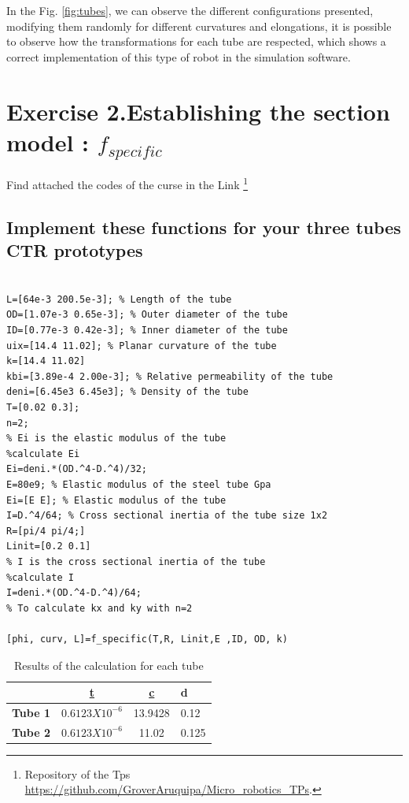 \documentclass[12pt, twoside]{report}
\begin{document}
In the Fig. \ref{fig:tubes}, we can observe the different configurations presented, modifying them randomly for different curvatures and elongations, it is possible to observe how the transformations for each tube are respected, which shows a correct implementation of this type of robot in the simulation software.





\section{Exercise 2.Establishing the section model : $f_{specific}$}
Find attached the codes of the curse in the Link \footnote{Repository of the Tps \url{https://github.com/GroverAruquipa/Micro_robotics_TPs}.}

\subsection{Implement these functions for your three tubes CTR prototypes}
\begin{lstlisting}
    
L=[64e-3 200.5e-3]; % Length of the tube
OD=[1.07e-3 0.65e-3]; % Outer diameter of the tube
ID=[0.77e-3 0.42e-3]; % Inner diameter of the tube
uix=[14.4 11.02]; % Planar curvature of the tube
k=[14.4 11.02]
kbi=[3.89e-4 2.00e-3]; % Relative permeability of the tube
deni=[6.45e3 6.45e3]; % Density of the tube
T=[0.02 0.3];
n=2;
% Ei is the elastic modulus of the tube
%calculate Ei 
Ei=deni.*(OD.^4-D.^4)/32;
E=80e9; % Elastic modulus of the steel tube Gpa 
Ei=[E E]; % Elastic modulus of the tube
I=D.^4/64; % Cross sectional inertia of the tube size 1x2
R=[pi/4 pi/4;]
Linit=[0.2 0.1]
% I is the cross sectional inertia of the tube
%calculate I
I=deni.*(OD.^4-D.^4)/64;
% To calculate kx and ky with n=2

[phi, curv, L]=f_specific(T,R, Linit,E ,ID, OD, k)
\end{lstlisting}

\begin{center}
    
\begin{table}[H]
\caption{Results of the calculation for each tube}
\centering
\begin{tabular}{|c|c|c|l|}
\hline
{\ul \textbf{}} & {\ul \textbf{t}} & {\ul \textbf{c}} & d \\ \hline
\textbf{Tube 1} &     $0.6123X10^{-6}$       &  13.9428               & 0.12  \\ \hline
\textbf{Tube 2} &   $0.6123X10^{-6}$               & 11.02                 &   0.125\\ \hline
\end{tabular}
\end{table}
\end{center}
\end{document}
